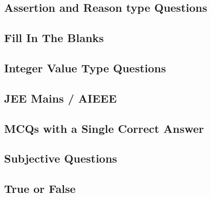 \subsection*{Assertion and Reason type Questions}
\begin{enumerate}[label=\thesubsection.\arabic*,ref=\thesubsection.\theenumi]




\end{enumerate}
\subsection*{Fill In The Blanks}
\begin{enumerate}[label=\thesubsection.\arabic*,ref=\thesubsection.\theenumi]




\end{enumerate}
\subsection*{Integer Value Type Questions}
\begin{enumerate}[label=\thesubsection.\arabic*,ref=\thesubsection.\theenumi]




\end{enumerate}
\subsection*{JEE Mains / AIEEE}
\begin{enumerate}[label=\thesubsection.\arabic*,ref=\thesubsection.\theenumi]




\end{enumerate}
\subsection*{MCQs with a Single Correct Answer}
\begin{enumerate}[label=\thesubsection.\arabic*,ref=\thesubsection.\theenumi]




\end{enumerate}
\subsection*{Subjective Questions}
\begin{enumerate}[label=\thesubsection.\arabic*,ref=\thesubsection.\theenumi]





\end{enumerate}
\subsection*{True or False}
\begin{enumerate}[label=\thesubsection.\arabic*,ref=\thesubsection.\theenumi]




\end{enumerate}
